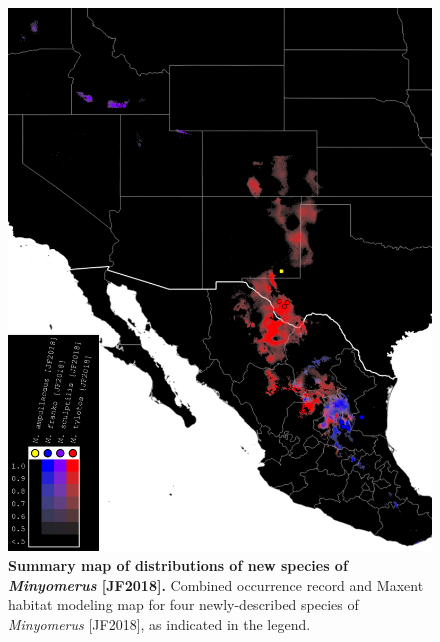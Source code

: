\documentclass[fleqn,10pt,lineno]{wlpeerj} %
\begin{document}
\begin{figure}[h]
	\centering
	\includegraphics[width=\textwidth]{figure35.png}
	\caption{\textbf{Summary map of distributions of new species of \textit{Minyomerus} [JF2018].} Combined occurrence record and Maxent habitat modeling map for four newly-described species of \textit{Minyomerus} [JF2018], as indicated in the legend.}
	\label{fig:map_summary}
\end{figure}
\end{document}
